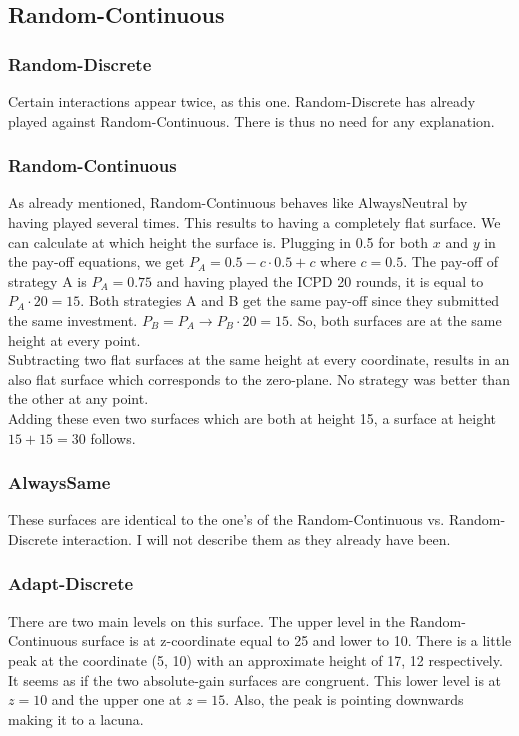 \documentclass[11pt]{article}
\begin{document}
\subsection{Random-Continuous}

\subsubsection*{Random-Discrete}
		Certain interactions appear twice, as this one.
		Random-Discrete has already played against Random-Continuous.
		There is thus no need for any explanation.\\
	

\subsubsection*{Random-Continuous}
		As already mentioned, Random-Continuous behaves like AlwaysNeutral by having played several times.
		This results to having a completely flat surface.
		We can calculate at which height the surface is.
		Plugging in 0.5 for both $x$ and $y$ in the pay-off equations, we get $P_A = 0.5 - c \cdot 0.5 + c$ where $c = 0.5$.
		The pay-off of strategy A is $P_A = 0.75$ and having played the ICPD 20 rounds, it is equal to $P_A \cdot 20 = 15$.
		Both strategies A and B get the same pay-off since they submitted the same investment.
		$P_B = P_A \rightarrow P_B \cdot 20 = 15$.
		So, both surfaces are at the same height at every point.\\

		Subtracting two flat surfaces at the same height at every coordinate, results in an also flat surface which corresponds to the zero-plane.
		No strategy was better than the other at any point.\\

		Adding these even two surfaces which are both at height 15, a surface at height $15 + 15 = 30$ follows.\\


\subsubsection*{AlwaysSame}
		These surfaces are identical to the one's of the Random-Continuous vs. Random-Discrete interaction.
		I will not describe them as they already have been.\\
	

\subsubsection*{Adapt-Discrete}
		There are two main levels on this surface.
		The upper level in the Random-Continuous surface is at z-coordinate equal to 25 and lower to 10.
		There is a little peak at the coordinate (5, 10) with an approximate height of 17, 12 respectively.\\
		It seems as if the two absolute-gain surfaces are congruent.
		This lower level is at $z = 10$ and the upper one at $z = 15$.
		Also, the peak is pointing downwards making it to a lacuna.\\
\end{document}
